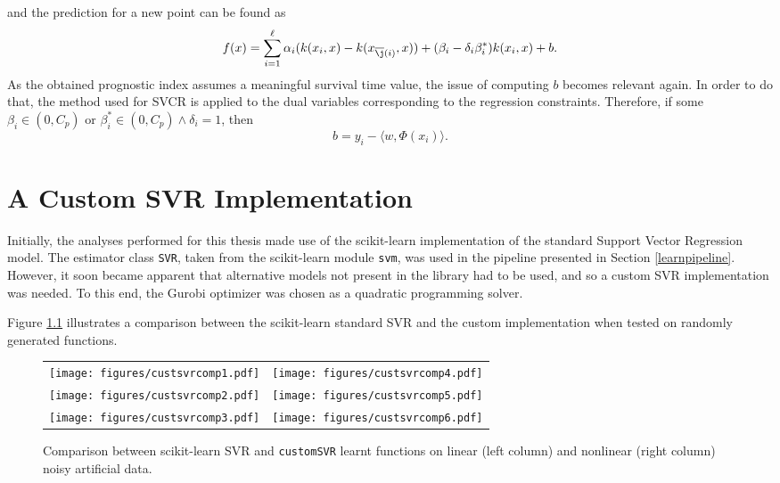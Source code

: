 \documentclass[12pt]{report}
\begin{document}
and the prediction for a new point can be found as
\begin{equation} \label{model2f}
f(x) = \sum_{i=1}^{\ell}\alpha_{i}(k(x_{i},x) - k(x_{\overline{\j}(i)},x))+(\beta_{i}-\delta_{i}\beta_{i}^{*})k(x_{i},x)+b \text{.}
\end{equation}
As the obtained prognostic index assumes a meaningful survival time value, the issue of computing $b$ becomes relevant again. In order to do that, the method used for SVCR is applied to the dual variables corresponding to the regression constraints. Therefore, if some $\beta_{i} \in (0,C_{p})$ or $\beta_{i}^{*} \in (0,C_{p}) \wedge \delta_{i} = 1$, then
\begin{equation} \label{model2b3}
b = y_{i} - \langle w,\Phi(x_{i})\rangle \text{.}
\end{equation}

\chapter{A Custom SVR Implementation}
\label{chcustsvr}
Initially, the analyses performed for this thesis made use of the scikit-learn \cite{sklearn} implementation of the standard Support Vector Regression model. The estimator class \texttt{SVR}, taken from the scikit-learn module \texttt{svm}, was used in the pipeline presented in Section \ref{learnpipeline}. However, it soon became apparent that alternative models not present in the library had to be used, and so a custom SVR implementation was needed. To this end, the Gurobi optimizer \cite{gurobi} was chosen as a quadratic programming solver.

Figure \ref{custsvrfig} illustrates a comparison between the scikit-learn standard SVR and the custom implementation when tested on randomly generated functions.

\begin{figure}[hp]
	\vspace*{-0.8cm}
	\begin{adjustwidth}{-1.5in}{-1in}
  	\centering
  	\begin{tabular}{cc}
  		\texttt{[image: figures/custsvrcomp1.pdf]} & 
  		\texttt{[image: figures/custsvrcomp4.pdf]} \\
		\texttt{[image: figures/custsvrcomp2.pdf]} &
		\texttt{[image: figures/custsvrcomp5.pdf]} \\
		\texttt{[image: figures/custsvrcomp3.pdf]} &
		\texttt{[image: figures/custsvrcomp6.pdf]} \\
  	\end{tabular}
  	\end{adjustwidth}
  	\vspace*{-0.2cm}
  	\caption{Comparison between scikit-learn SVR and \texttt{customSVR} learnt functions on linear (left column) and nonlinear (right column) noisy artificial data.}
  	\label{custsvrfig}
\end{figure}
\end{document}
